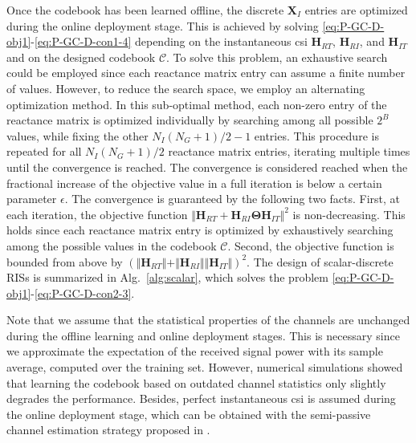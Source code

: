 \documentclass[twocolumn,10pt]{IEEEtran}
\begin{document}
Once the codebook has been learned offline, the discrete $\mathbf{X}_{I}$ entries are optimized during the online deployment stage.
This is achieved by solving \eqref{eq:P-GC-D-obj1}-\eqref{eq:P-GC-D-con1-4} depending on the instantaneous \gls{csi} $\mathbf{H}_{RT}$, $\mathbf{H}_{RI}$, and $\mathbf{H}_{IT}$ and on the designed codebook $\mathcal{C}$.
To solve this problem, an exhaustive search could be employed since each reactance matrix entry can assume a finite number of values.
However, to reduce the search space, we employ an alternating optimization method.
In this sub-optimal method, each non-zero entry of the reactance matrix is optimized individually by searching among all possible $2^{B}$ values, while fixing the other $N_I\left(N_{G}+1\right)/2-1$ entries.
This procedure is repeated for all $N_I\left(N_{G}+1\right)/2$ reactance matrix entries, iterating multiple times until the convergence is reached.
The convergence is considered reached when the fractional increase of the objective value in a full iteration is below a certain parameter $\epsilon$.
The convergence is guaranteed by the following two facts.
First, at each iteration, the objective function $\Vert\mathbf{H}_{RT}+\mathbf{H}_{RI}\boldsymbol{\Theta}\mathbf{H}_{IT}\Vert^{2}$ is non-decreasing.
This holds since each reactance matrix entry is optimized by exhaustively searching among the possible values in the codebook $\mathcal{C}$.
Second, the objective function is bounded from above by $(\Vert\mathbf{H}_{RT}\Vert+\Vert\mathbf{H}_{RI}\Vert\Vert\mathbf{H}_{IT}\Vert)^2$.
The design of scalar-discrete RISs is summarized in Alg.~\ref{alg:scalar}, which solves the problem \eqref{eq:P-GC-D-obj1}-\eqref{eq:P-GC-D-con2-3}.

Note that we assume that the statistical properties of the channels are unchanged during the offline learning and online deployment stages.
This is necessary since we approximate the expectation of the received signal power with its sample average, computed over the training set.
However, numerical simulations showed that learning the codebook based on outdated channel statistics only slightly degrades the performance.
Besides, perfect instantaneous \gls{csi} is assumed during the online deployment stage, which can be obtained with the semi-passive channel estimation strategy proposed in \cite{wu21}.
\end{document}

